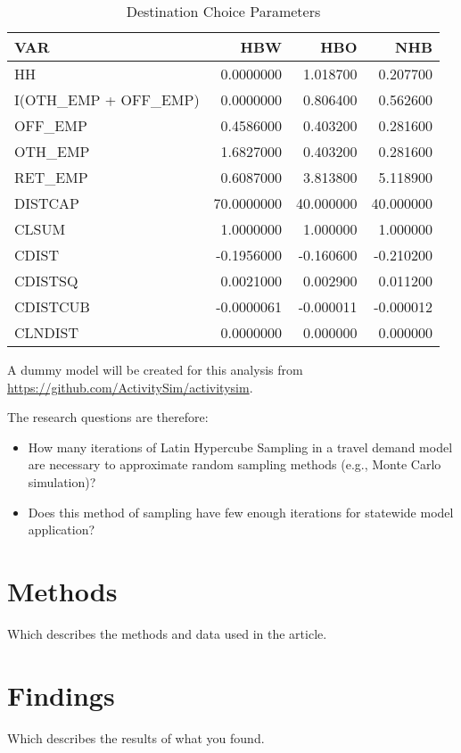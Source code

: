 \documentclass[3p, authoryear, review]{elsarticle} %
\providecommand{\tightlist}{%
  \setlength{\itemsep}{0pt}\setlength{\parskip}{0pt}}
\begin{document}
\begin{table}

\caption{\label{tab:DCparam}Destination Choice Parameters}
\centering
\begin{tabular}[t]{l|r|r|r}
\hline
VAR & HBW & HBO & NHB\\
\hline
HH & 0.0000000 & 1.018700 & 0.207700\\
\hline
I(OTH\_EMP + OFF\_EMP) & 0.0000000 & 0.806400 & 0.562600\\
\hline
OFF\_EMP & 0.4586000 & 0.403200 & 0.281600\\
\hline
OTH\_EMP & 1.6827000 & 0.403200 & 0.281600\\
\hline
RET\_EMP & 0.6087000 & 3.813800 & 5.118900\\
\hline
DISTCAP & 70.0000000 & 40.000000 & 40.000000\\
\hline
CLSUM & 1.0000000 & 1.000000 & 1.000000\\
\hline
CDIST & -0.1956000 & -0.160600 & -0.210200\\
\hline
CDISTSQ & 0.0021000 & 0.002900 & 0.011200\\
\hline
CDISTCUB & -0.0000061 & -0.000011 & -0.000012\\
\hline
CLNDIST & 0.0000000 & 0.000000 & 0.000000\\
\hline
\end{tabular}
\end{table}

A dummy model will be created for this analysis from \url{https://github.com/ActivitySim/activitysim}.

The research questions are therefore:

\begin{itemize}
\tightlist
\item
  How many iterations of Latin Hypercube Sampling in a travel demand model are necessary to approximate random sampling methods (e.g., Monte Carlo simulation)?
\item
  Does this method of sampling have few enough iterations for statewide model application?
\end{itemize}

\hypertarget{methods}{%
\section{Methods}\label{methods}}

Which describes the methods and data used in the article.

\hypertarget{findings}{%
\section{Findings}\label{findings}}

Which describes the results of what you found.


\end{document}
